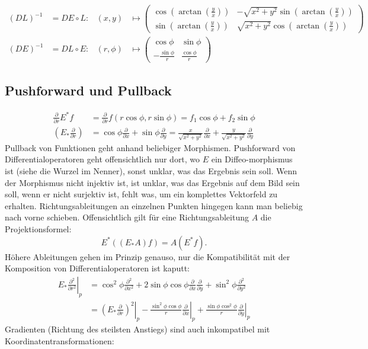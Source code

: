 \documentclass[12pt]{article}
\newcommand*{\diff}[1]{\ensuremath{\frac{\partial}{\partial #1}}}
\newcommand*{\ddiff}[1]{\ensuremath{\frac{\partial^2}{\partial #1 ^2}}}
\begin{document}
\begin{align*}
\left(DL\right)^{-1} &= DE\circ L: & (x,y) &\longmapsto  \left(
\begin{array}{cc}
\cos\left(\arctan(\frac{y}{x})\right)& -\sqrt{x^2+y^2}\sin\left(\arctan(\frac{y}{x})\right)\\
\sin\left(\arctan(\frac{y}{x})\right)& \sqrt{x^2+y^2}\cos\left(\arctan(\frac{y}{x})\right)
\end{array}
\right) \\
\left(DE\right)^{-1} &= DL\circ E: & (r,\phi) &\longmapsto  \left(
\begin{array}{cc}
\cos\phi& \sin\phi\\
-\frac{\sin\phi}{r} & \frac{\cos\phi}{r}
\end{array}
\right) 
\end{align*}
\subsection{Pushforward und Pullback}
\begin{align*}
\diff{r}E^*f &= \diff{r} f(r\cos\phi, r\sin\phi) = f_1 \cos\phi + f_2\sin\phi \\
\left(E_*\diff{r}\right) &= \cos\phi \diff{x} + \sin\phi\diff{y} = \frac{x}{\sqrt{x^2+y^2}}\diff{x}+ \frac{y}{\sqrt{x^2+y^2}}\diff{y}
\end{align*}
Pullback von Funktionen geht anhand beliebiger Morphismen.
Pushforward von Differentialoperatoren geht offensichtlich nur dort, wo $E$ ein Diffeo-morphismus ist (siehe die Wurzel im Nenner), sonst unklar, was das Ergebnis sein soll. 
Wenn der Morphismus nicht injektiv ist, ist unklar, was das Ergebnis auf dem Bild sein soll, wenn er nicht surjektiv ist, fehlt was, um ein komplettes Vektorfeld zu erhalten.
Richtungsableitungen an einzelnen Punkten hingegen kann man beliebig nach vorne schieben. Offensichtlich gilt f\"ur eine Richtungsableitung $A$ die Projektionsformel:
$$
E^*\left((E_*A)f\right) = A(E^* f).
$$
H\"ohere Ableitungen gehen im Prinzip genauso, nur die Kompatibilit\"at mit der Komposition von Differentialoperatoren ist kaputt:
\begin{align*}
E_*\left. \ddiff{r}\right|_p &= \cos^2\phi\ddiff{x} + 2 \sin\phi\cos\phi \diff{x}\diff{y} + \sin^2 \phi \ddiff{y}
\\
&= \left.\left(E_*\diff{r}\right)^2\right|_p - \left. \frac{\sin^2\phi\cos\phi}{r}\diff{x} \right|_p + \left. \frac{\sin\phi\cos^2\phi}{r}\diff{y}\right|_p 
\end{align*}
Gradienten (Richtung des steilsten Anstiegs) sind auch inkompatibel mit Koordinatentransformationen:
\end{document}
